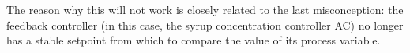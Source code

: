 The reason why this will not work is closely related to the last misconception: the feedback controller (in this case, the syrup concentration controller AC) no longer has a stable setpoint from which to compare the value of its process variable.




